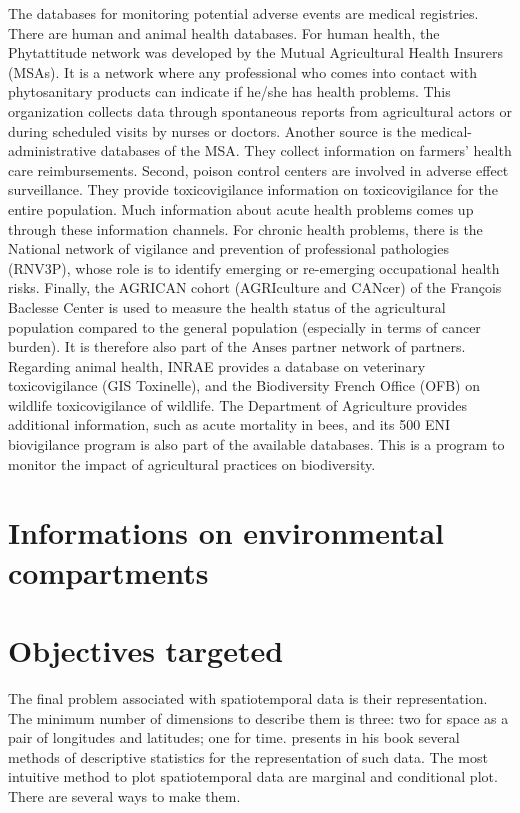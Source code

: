 The databases for monitoring potential adverse events are medical registries. There are human and animal health databases. For human health, the Phytattitude network was developed by the Mutual Agricultural Health Insurers (MSAs). It is a network where any professional who comes into contact with phytosanitary products can indicate if he/she has health problems. This organization collects data through spontaneous reports from agricultural actors or during scheduled visits by nurses or doctors. Another source is the medical-administrative databases of the MSA. They collect information on farmers' health care reimbursements. Second, poison control centers are involved in adverse effect surveillance. They provide toxicovigilance information on toxicovigilance for the entire population. Much information about acute health problems comes up through these information channels. For chronic health problems, there is the National network of vigilance and prevention of professional pathologies (RNV3P), whose role is to identify emerging or re-emerging occupational health risks. Finally, the AGRICAN cohort (AGRIculture and CANcer) of the François Baclesse Center is used to measure the health status of the agricultural population compared to the general population (especially in terms of cancer burden). It is therefore also part of the Anses partner network of partners. Regarding animal health, INRAE provides a database on veterinary toxicovigilance (GIS Toxinelle), and the Biodiversity French Office (OFB) on wildlife toxicovigilance of wildlife. The Department of Agriculture provides additional information, such as acute mortality in bees, and its 500 ENI biovigilance program is also part of the available databases. This is a program to monitor the impact of agricultural practices on biodiversity.


\section{Informations on environmental compartments}\label{chp:2:4}





\section{Objectives targeted}\label{chp:2:5}

The final problem associated with spatiotemporal data is their representation. The minimum number of dimensions to describe them is three: two for space as a pair of longitudes and latitudes; one for time. \cite{cressie2015} presents in his book several methods of descriptive statistics for the representation of such data. The most intuitive method to plot spatiotemporal data are marginal and conditional plot. There are several ways to make them.

